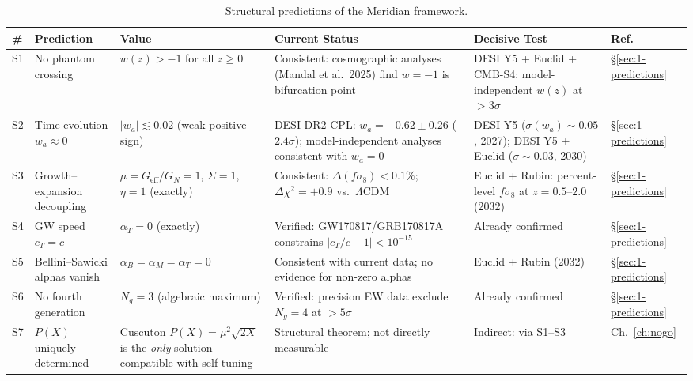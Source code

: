 \begin{table}[h!]
\caption{Structural predictions of the Meridian framework.}
\label{tab:pred-structural}
\small
\renewcommand{\arraystretch}{1.25}
\begin{tabular}{@{}p{0.6cm}p{3.8cm}p{3.2cm}p{3.2cm}p{2.8cm}p{1.8cm}@{}}
\toprule
\textbf{\#} & \textbf{Prediction} & \textbf{Value} & \textbf{Current Status} & \textbf{Decisive Test} & \textbf{Ref.} \\
\midrule

S1 &
No phantom crossing &
$w(z) > -1$ for all $z \geq 0$ &
Consistent: cosmographic analyses (Mandal et al.\ 2025) find $w = -1$ is bifurcation point &
DESI Y5 + Euclid + CMB-S4: model-independent $w(z)$ at $>3\sigma$ &
\S\ref{sec:1-predictions} \\

S2 &
Time evolution $w_a \approx 0$ &
$|w_a| \lesssim 0.02$ (weak positive sign) &
DESI DR2 CPL: $w_a = -0.62 \pm 0.26$ ($2.4\sigma$); model-independent analyses consistent with $w_a = 0$ &
DESI Y5 ($\sigma(w_a) \sim 0.05$, 2027); DESI Y5 + Euclid ($\sigma \sim 0.03$, 2030) &
\S\ref{sec:1-predictions} \\

S3 &
Growth--expansion decoupling &
$\mu = G_\mathrm{eff}/G_N = 1$, $\Sigma = 1$, $\eta = 1$ (exactly) &
Consistent: $\Delta(f\sigma_8) < 0.1\%$; $\Delta\chi^2 = +0.9$ vs.\ $\Lambda$CDM &
Euclid + Rubin: percent-level $f\sigma_8$ at $z = 0.5$--$2.0$ (2032) &
\S\ref{sec:1-predictions} \\

S4 &
GW speed $c_T = c$ &
$\alpha_T = 0$ (exactly) &
Verified: GW170817/GRB170817A constrains $|c_T/c - 1| < 10^{-15}$ &
Already confirmed &
\S\ref{sec:1-predictions} \\

S5 &
Bellini--Sawicki alphas vanish &
$\alpha_B = \alpha_M = \alpha_T = 0$ &
Consistent with current data; no evidence for non-zero alphas &
Euclid + Rubin (2032) &
\S\ref{sec:1-predictions} \\

S6 &
No fourth generation &
$N_g = 3$ (algebraic maximum) &
Verified: precision EW data exclude $N_g = 4$ at $>5\sigma$ &
Already confirmed &
\S\ref{sec:1-predictions} \\

S7 &
$P(X)$ uniquely determined &
Cuscuton $P(X) = \mu^2\sqrt{2X}$ is the \emph{only} solution compatible with self-tuning &
Structural theorem; not directly measurable &
Indirect: via S1--S3 &
Ch.~\ref{ch:nogo} \\

\bottomrule
\end{tabular}
\end{table}

